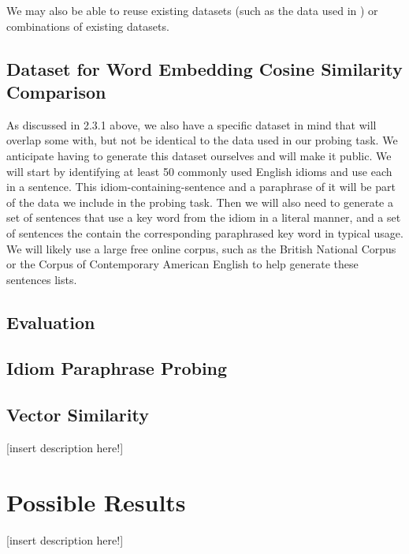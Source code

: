 \documentclass[11pt,a4paper]{article}
\begin{document}
We may also be able to reuse existing datasets (such as the data used in \cite{bizzoni-lappin-2018-predicting}) or combinations of existing datasets. 

\vspace{15mm}


\subsection{Dataset for Word Embedding Cosine Similarity Comparison}
As discussed in 2.3.1 above, we also have a specific dataset in mind that will overlap some with, but not be identical to the data used in our probing task. We anticipate having to generate this dataset ourselves and will make it public. We will start by identifying at least 50 commonly used English idioms and use each in a sentence. This idiom-containing-sentence and a paraphrase of it will be part of the data we include in the probing task. Then we will also need to generate a set of sentences that use a key word from the idiom in a literal manner, and a set of sentences the contain the corresponding paraphrased key word in typical usage. We will likely use a large free online corpus, such as the British National Corpus or the Corpus of Contemporary American English to help generate these sentences lists.

\subsection{Evaluation}

\subsection{Idiom Paraphrase Probing}

\subsection{Vector Similarity}
\vspace{5mm}
[insert description here!]

\vspace{15mm}






\section{Possible Results}
\vspace{5mm}
[insert description here!]
\end{document}
